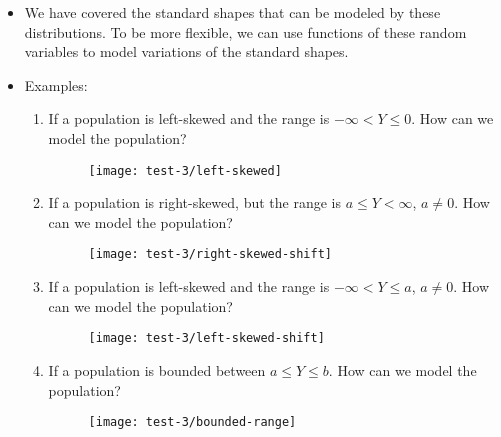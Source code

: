 \documentclass{article}
\begin{document}
\begin{itemize}
    \item We have covered the standard shapes that can be modeled by these distributions. To be more flexible, we can use functions of these random variables to model variations of the standard shapes.
    \item Examples:
    \begin{enumerate}
        \item If a population is left-skewed and the range is $-\infty < Y \le 0$. How can we model the population?
        \begin{figure}[H]
            \texttt{[image: test-3/left-skewed]}
        \end{figure}
        \item If a population is right-skewed, but the range is $a \le Y < \infty$, $a \ne 0$. How can we model the population?
        \begin{figure}[H]
            \texttt{[image: test-3/right-skewed-shift]}
        \end{figure}
        \item If a population is left-skewed and the range is $-\infty < Y \le a$, $a \ne 0$. How can we model the population?
        \begin{figure}[H]
            \texttt{[image: test-3/left-skewed-shift]}
        \end{figure}
        \item If a population is bounded between $a \le Y \le b$. How can we model the population?
        \begin{figure}[H]
            \texttt{[image: test-3/bounded-range]}
        \end{figure}
    \end{enumerate}
\end{itemize}
\end{document}
